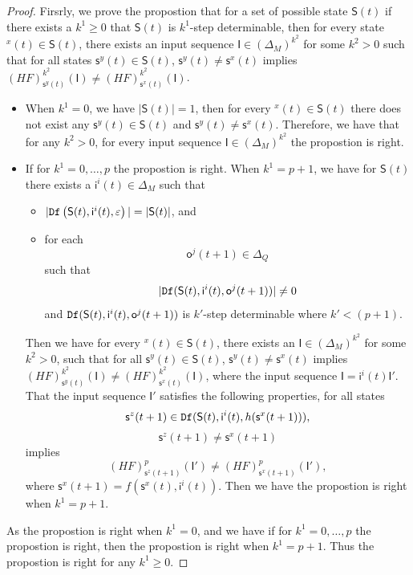 \begin{proof} Firsrly, we prove the propostion that for a set of possible state $\mathsf{S}(t)$ if there exists a $k^{1}\ge 0$ that $\mathsf{S}(t)$ is $k^{1}$-step determinable, then for every state \State$^{x}(t)\in \mathsf{S}(t)$, there exists an input sequence $\mathsf{I}\in(\Delta_M)^{k^2}$ for some $k^2 >0$ such that for all states $\mathsf{s}^{y}(t)\in \mathsf{S}(t)$, $\mathsf{s}^{y}(t)\neq \mathsf{s}^{x}(t)$ implies $(HF)^{k^2}_{\mathsf{s}^{y}(t)}(\mathsf{I})\neq (HF)^{k^2}_{{\mathsf{s}^{x}(t)}}(\mathsf{I})$.
\begin{itemize}
\item When $k^{1}=0$, we have $|\mathsf{S}(t)|=1$, then for every \State$^{x}(t)$$\in \mathsf{S}(t)$ there does not exist any $\mathsf{s}^{y}(t)\in \mathsf{S}(t)$ and $\mathsf{s}^{y}(t)\neq \mathsf{s}^{x}(t)$. Therefore, we have that for any $k^2 >0$, for every input sequence $\mathsf{I}\in(\Delta_M)^{k^2}$ the propostion is right. 
\item If for $k^{1}=0,\ldots, p$ the propostion is right. When $k^{1}=p+1$, we have for $\mathsf{S}(t)$ there exists a $\mathsf{i}^{i}(t)\in \Delta_M$ such that
 \begin{itemize}
 \item  $|{\tt Df}\left(\mathsf{S}(t),\mathsf{i}^{i}(t),\varepsilon\right)|=|\mathsf{S}(t)|$, and 
 \item  for each \[\mathsf{o}^{j}(t+1)\in \Delta_Q\] such that \[|{\tt Df}(\mathsf{S}(t),\mathsf{i}^{i}(t),\mathsf{o}^{j}(t+1))|\neq 0\] and ${\tt Df}(\mathsf{S}(t),\mathsf{i}^{i}(t),\mathsf{o}^{j}(t+1))$ is $k'$-step determinable where ${k'}<(p+1)$.
 \end{itemize}
 Then we have for every \State$^{x}(t)$$\in \mathsf{S}(t)$, there exists an $\mathsf{I}\in(\Delta_M)^{k^2}$ for some $k^2 >0$, such that for all $\mathsf{s}^{y}(t)\in \mathsf{S}(t)$, $\mathsf{s}^{y}(t)\neq \mathsf{s}^{x}(t)$ implies $(HF)^{k^2}_{\mathsf{s}^{y}(t)}(\mathsf{I})\neq (HF)^{k^2}_{{\mathsf{s}^{x}(t)}}(\mathsf{I})$, where the input sequence $\mathsf{I}=\mathsf{i}^{i}(t)\mathsf{I}'$. That the input sequence $\mathsf{I}'$ satisfies the following properties, %
  for all states \[\mathsf{s}^{z}(t+1)\in {\tt Df}(\mathsf{S}(t),\mathsf{i}^{i}(t),h(\mathsf{s}^{x}(t+1))),\]\[\mathsf{s}^{z}(t+1)\neq \mathsf{s}^{x}(t+1)\] implies \[(HF)^p_{\mathsf{s}^{z}(t+1)}(\mathsf{I}')\neq (HF)^p_{{\mathsf{s}^{x}(t+1)}}(\mathsf{I}'),\] where $\mathsf{s}^{x}(t+1)=f(\mathsf{s}^{x}(t),\mathsf{i}^{i}(t))$. Then we have the propostion is right when $k^{1}=p+1$. 
\end{itemize}
As the propostion is right when $k^{1}=0$, and we have if for $k^{1}=0,\ldots, p$ the propostion is right, then the propostion is right when $k^{1}=p+1$. Thus the propostion is right for any $k^{1}\ge0$.


\end{proof}
